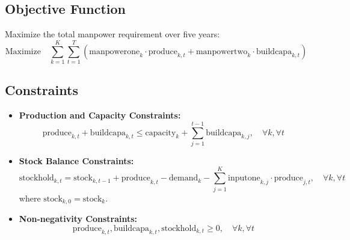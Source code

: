 \documentclass{article}
\begin{document}
\subsection*{Objective Function}
Maximize the total manpower requirement over five years:
\[
\text{Maximize} \quad \sum_{k=1}^{K} \sum_{t=1}^{T} \left( \text{manpowerone}_k \cdot \text{produce}_{k,t} + \text{manpowertwo}_k \cdot \text{buildcapa}_{k,t} \right)
\]

\subsection*{Constraints}
\begin{itemize}
    \item \textbf{Production and Capacity Constraints:}
    \[
    \text{produce}_{k,t} + \text{buildcapa}_{k,t} \leq \text{capacity}_k + \sum_{j=1}^{t-1} \text{buildcapa}_{k,j}, \quad \forall k, \forall t
    \]

    \item \textbf{Stock Balance Constraints:}
    \[
    \text{stockhold}_{k,t} = \text{stock}_{k,t-1} + \text{produce}_{k,t} - \text{demand}_k - \sum_{j=1}^{K} \text{inputone}_{k,j} \cdot \text{produce}_{j,t}, \quad \forall k, \forall t
    \]
    where $\text{stock}_{k,0} = \text{stock}_k$.

    \item \textbf{Non-negativity Constraints:}
    \[
    \text{produce}_{k,t}, \text{buildcapa}_{k,t}, \text{stockhold}_{k,t} \geq 0, \quad \forall k, \forall t
    \]
\end{itemize}
\end{document}
